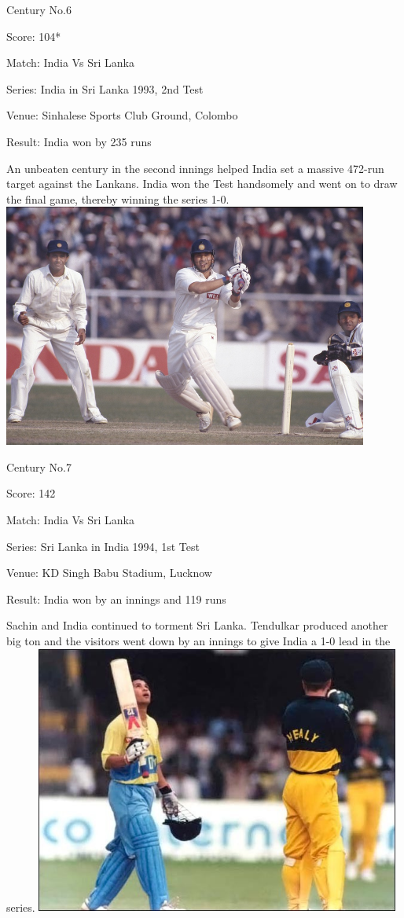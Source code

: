 \documentclass[11pt, a4paper]{article}
\begin{document}
Century No.6 

Score: 104* 

Match: India Vs Sri Lanka 

Series: India in Sri Lanka 1993, 2nd Test 

Venue: Sinhalese Sports Club Ground, Colombo 

Result: India won by 235 runs 

An unbeaten century in the second innings helped India set a massive 472-run target against the Lankans. India won the Test handsomely and went on to draw the final game, thereby winning the series 1-0.
\newpage
\includegraphics[width=0.9\textwidth]{pics/7.jpg}

Century No.7 

Score: 142 

Match: India Vs Sri Lanka 

Series: Sri Lanka in India 1994, 1st Test 

Venue: KD Singh Babu Stadium, Lucknow 

Result: India won by an innings and 119 runs 

Sachin and India continued to torment Sri Lanka. Tendulkar produced another big ton and the visitors went down by an innings to give India a 1-0 lead in the series.
\newpage
\includegraphics[width=0.9\textwidth]{pics/8.jpg}
\end{document}
